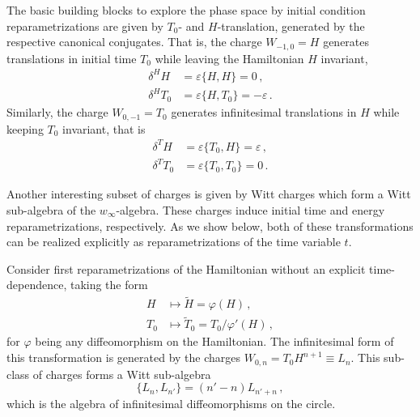 \documentclass[twocolumn,notitlepage,superscriptaddress, nofootinbib,nobibnotes, aps,prd,10pt]{revtex4-1}%
\begin{document}
The basic building blocks to explore the phase space by initial condition reparametrizations are given by $T_0$- and $H$-translation, generated by the respective canonical conjugates. That is, the charge $W_{-1,0} = H$ generates translations in initial time $T_0$ while leaving the Hamiltonian $H$ invariant,
%
\begin{subequations}
\begin{align}
    \delta^H H &= \varepsilon\{H,H\} = 0\, ,\\[7pt]
    \delta^H T_0 &= \varepsilon\{H,T_0\} = -\varepsilon\, .
\end{align}
\end{subequations}
%
Similarly, the charge $W_{0,-1} = T_0$ generates infinitesimal translations in $H$ while keeping $T_0$ invariant, that is
%
\begin{subequations}
\begin{align}
    \delta^{T}H &= \varepsilon\{T_0,H\} = \varepsilon\, ,\\[7pt]
    \delta^T T_0 &= \varepsilon\{T_0,T_0\} = 0\, .
\end{align}
\end{subequations}


Another interesting subset of charges is given by Witt charges which form a Witt sub-algebra of the $w_\infty$-algebra. These charges induce initial time and energy reparametrizations, respectively. As we show below, both of these transformations can be realized explicitly as reparametrizations of the time variable $t$. 

Consider first reparametrizations of the Hamiltonian without an explicit time-dependence, taking the form 
%
\begin{subequations}\label{eq:H reparametrization}
\begin{align}
    H&\mapsto \tilde{H} = \varphi(H)\, ,\\[7pt]
    T_0&\mapsto \tilde{T}_0 = T_0/\varphi'(H)\, ,\label{eq:H reparam: T0}
\end{align}
\end{subequations}
%
for $\varphi$ being any diffeomorphism on the Hamiltonian. The infinitesimal form of this transformation is generated by the charges $W_{0,n} = T_0 H^{n+1}\equiv L_n$. This sub-class of charges forms a Witt sub-algebra
%
\begin{equation}\label{eq:Witt algebra}
\{L_n,L_{n'}\} = (n'-n)L_{n'+n}\, ,
\end{equation}
%
which is the algebra of infinitesimal diffeomorphisms on the circle. 
\end{document}
